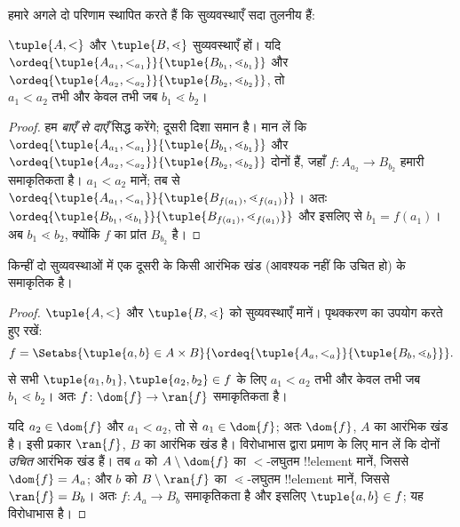 \documentclass[../../../include/open-logic-section]{subfiles}
\begin{document}
हमारे अगले दो परिणाम स्थापित करते हैं कि सुव्यवस्थाएँ सदा तुलनीय हैं:

\begin{lem}
$\tuple{A, <}$ और $\tuple{B, \lessdot}$ सुव्यवस्थाएँ हों। यदि
$\ordeq{\tuple{A_{a_1}, <_{a_1}}}{\tuple{B_{b_1}, \lessdot_{b_1}}}$
और $\ordeq{\tuple{A_{{a_2}}, <_{a_2}}}{\tuple{B_{{b_2}},
\lessdot_{b_2}}}$, तो ${a_1} < {a_2} \text{ तभी और केवल तभी जब }
{b_1} \lessdot {b_2}$।
\end{lem}

\begin{proof}
हम \emph{बाएँ से दाएँ} सिद्ध करेंगे; दूसरी दिशा समान है। मान लें कि
$\ordeq{\tuple{A_{a_1}, <_{a_1}}}{\tuple{B_{b_1}, \lessdot_{b_1}}}$ और
$\ordeq{\tuple{A_{{a_2}}, <_{a_2}}}{\tuple{B_{{b_2}},
\lessdot_{b_2}}}$ दोनों हैं, जहाँ $f \colon A_{{a_2}} \to B_{{b_2}}$
हमारी समाकृतिकता है। ${a_1} < {a_2}$ मानें; तब
 से
$\ordeq{\tuple{A_{a_1}, <_{a_1}}}{\tuple{B_{f({a_1})},
\lessdot_{f({a_1})}}}$। अतः
$\ordeq{\tuple{B_{b_1}, \lessdot_{b_1}}}{\tuple{B_{f({a_1})},
\lessdot_{f({a_1})}}}$ और इसलिए  से
${b_1} = f({a_1})$। अब ${b_1} \lessdot {b_2}$, क्योंकि $f$ का प्रांत
$B_{{b_2}}$ है।
\end{proof}

\begin{thm}
किन्हीं दो सुव्यवस्थाओं में एक दूसरी के किसी आरंभिक खंड (आवश्यक नहीं कि
उचित हो) के समाकृतिक है।
\end{thm}

\begin{proof}
$\tuple{A, <}$ और $\tuple{B, \lessdot}$ को सुव्यवस्थाएँ मानें। पृथक्करण का
उपयोग करते हुए रखें:
\[
	f = \Setabs{\tuple{a, b} \in A \times B}{
		\ordeq{\tuple{A_a, <_a}}{\tuple{B_b, \lessdot_b}}}.
\]
 से सभी
$\tuple{a_1, b_1}, \tuple{a_2, b_2} \in f$ के लिए $a_1 < a_2$ तभी और
केवल तभी जब $b_1 \lessdot b_2$। अतः
$f \colon \dom{f} \to \ran{f}$ समाकृतिकता है।

यदि $a_2 \in \dom{f}$ और $a_1 < a_2$, तो
 से $a_1 \in \dom{f}$; अतः $\dom{f}$,
$A$ का आरंभिक खंड है। इसी प्रकार $\ran{f}$, $B$ का आरंभिक खंड है। विरोधाभास
द्वारा प्रमाण के लिए मान लें कि दोनों \emph{उचित} आरंभिक खंड हैं। तब $a$ को
$A \setminus \dom{f}$ का $<$-लघुतम !!{element} मानें, जिससे
$\dom{f} = A_a$; और $b$ को $B \setminus \ran{f}$ का $\lessdot$-लघुतम
!!{element} मानें, जिससे $\ran{f} = B_b$। अतः
$f \colon A_a \to B_b$ समाकृतिकता है और इसलिए $\tuple{a, b} \in f$;
यह विरोधाभास है।
\end{proof}
\end{document}

